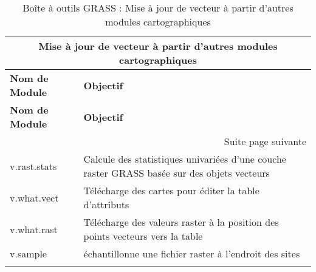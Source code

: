 \begin{center}
{\setlength{\extrarowheight}{10pt}
\small
\begin{longtable}{|p{4cm}|p{10cm}|}
  \hline \multicolumn{2}{|c|}{\textbf{Mise à jour de vecteur à partir d'autres modules cartographiques}}\\
\hline \textbf{Nom de Module}&\textbf{Objectif}\\
\endfirsthead
\hline \textbf{Nom de Module}&\textbf{Objectif}\\
\endhead
\hline \multicolumn{2}{|r|}{{Suite page suivante}} \\ \hline
\endfoot
\endlastfoot
  \hline v.rast.stats & Calcule des statistiques univariées d'une couche raster GRASS basée sur des objets vecteurs\\
  \hline v.what.vect & Télécharge des cartes pour éditer la table d'attributs\\
  \hline v.what.rast & Télécharge des valeurs raster à la position des points vecteurs vers la table\\
  \hline v.sample & échantillonne une fichier raster à l'endroit des sites\\
\hline
\caption{Boîte à outils GRASS : Mise à jour de vecteur à partir d'autres modules cartographiques}
\end{longtable}}
\end{center} 

